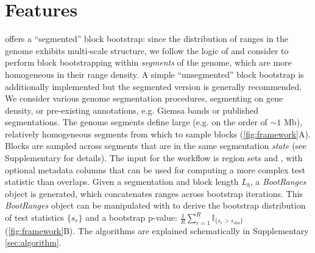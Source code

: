 \section{Features}

\bootranges offers a ``segmented'' block bootstrap:
since the distribution of ranges in the genome exhibits multi-scale
structure, we follow the logic of \citet{bickel2010subsampling} and consider to
perform block bootstrapping within \textit{segments} of the genome, which are
more homogeneous in their range density.
A simple ``unsegmented'' block bootstrap is additionally implemented but the segmented version is generally recommended.
We consider various genome segmentation procedures, segmenting on gene density,
or pre-existing annotations, e.g. Giemsa bands or published segmentations.
The genome segments define large (e.g. on the order of ${\sim}1$ Mb),
relatively homogeneous segments from which to sample blocks
(\cref{fig:framework}A).
Blocks are sampled across segments that are in the same segmentation \textit{state} (see Supplementary for details).
The input for the workflow is region sets  and
, with optional metadata columns that can be
used for computing a more complex test statistic than overlaps.
Given a segmentation and block length $L_b$, a \textit{BootRanges}
object is generated, which concatenates ranges across bootstrap
iterations. This \textit{BootRanges} object can be manipulated with \plyranges
to derive the bootstrap distribution of test statistics $\{s_r\}$ and a
bootstrap p-value:
$ \frac{1}{R} \sum_{r=1}^R \mathbb{I}_{\{s_r > s_\text{obs}\}} $ (\cref{fig:framework}B).
The \bootranges algorithms are explained schematically in Supplementary \cref{sec:algorithm}.

